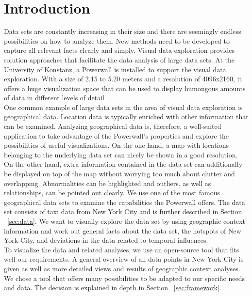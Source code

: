 \documentclass[sigconf, authorversion, nonacm=true]{acmart}
\begin{document}
\section{Introduction}
\label{sec:intro}

Data sets are constantly increasing in their size and there are seemingly endless possibilities on how to analyze them. New methods need to be developed to capture all relevant facts clearly and simply. Visual data exploration provides solution approaches that facilitate the data analysis of large data sets. At the University of Konstanz, a Powerwall is installed to support the visual data exploration. With a size of 2.15 to 5.20 meters and a resolution of 4096x2160, it offers a huge visualization space that can be used to display humongous amounts of data in different levels of detail ~\citep{powerwall}. \\

One common example of large data sets in the area of visual data exploration is geographical data. Location data is typically enriched with other information that can be examined. Analyzing geographical data is, therefore, a well-suited application to take advantage of the Powerwall's properties and explore the possibilities of useful visualizations. On the one hand, a map with locations belonging to the underlying data set can nicely be shown in a good resolution. On the other hand, extra information contained in the data set can additionally be displayed on top of the map without worrying too much about clutter and overlapping. Abnormalities can be highlighted and outliers, as well as relationships, can be pointed out clearly. We use one of the most famous geographical data sets to examine the capabilities the Powerwall offers. The data set consists of taxi data from New York City and is further described in Section ~\ref{sec:data}. We want to visually explore the data set by using geographic context information and work out general facts about the data set, the hotspots of New York City, and deviations in the data related to temporal influences. \\

To visualize the data and related analyses, we use an open-source tool that fits well our requirements. A general overview of all data points in New York City is given as well as more detailed views and results of geographic context analyses. We chose a tool that offers many possibilities to be adapted to our specific needs and data. The decision is explained in depth in Section ~\ref{sec:framework}.\\
\end{document}
